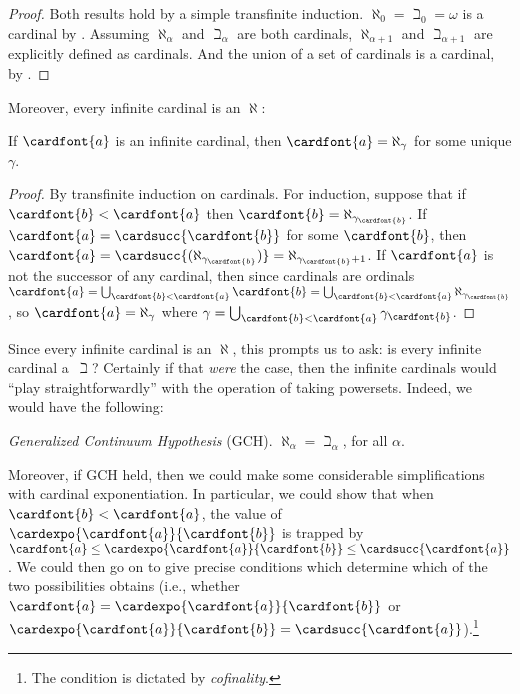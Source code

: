 \documentclass[../../../include/open-logic-section]{subfiles}
\begin{document}
\begin{proof}
Both results hold by a simple transfinite induction. $\aleph_0 =
\beth_0 = \omega$ is a cardinal by
. Assuming $\aleph_\alpha$ and
$\beth_\alpha$ are both cardinals, $\aleph_{\alpha+1}$ and
$\beth_{\alpha+1}$ are explicitly defined as cardinals. And the union
of a set of cardinals is a cardinal, by
.
\end{proof}
\noindent
Moreover, every infinite cardinal is an $\aleph$:

\begin{prop}
If $\cardfont{a}$ is an infinite cardinal, then $\cardfont{a} =
\aleph_\gamma$ for some unique $\gamma$.
\end{prop}

\begin{proof}
By transfinite induction on cardinals. For induction, suppose that if
$\cardfont{b} < \cardfont{a}$ then $\cardfont{b} =
\aleph_{\gamma_\cardfont{b}}$. If $\cardfont{a} =
\cardsucc{\cardfont{b}}$ for some $\cardfont{b}$, then $\cardfont{a} =
\cardsucc{(\aleph_{\gamma_\cardfont{b}})}=
\aleph_{\gamma_\cardfont{b}+1}$. If $\cardfont{a}$ is not the
successor of any cardinal, then since cardinals are ordinals
$\cardfont{a} = \bigcup_{\cardfont{b} < \cardfont{a}} \cardfont{b} =
\bigcup_{\cardfont{b} < \cardfont{a}}{\aleph_{\gamma_\cardfont{b}}}$,
so $\cardfont{a} = \aleph_\gamma$ where $\gamma =
\bigcup_{\cardfont{b} < \cardfont{a}}\gamma_\cardfont{b}$. 
\end{proof}

Since every infinite cardinal is an $\aleph$, this prompts us to ask:
is every infinite cardinal a~$\beth$? Certainly if that \emph{were}
the case, then the infinite cardinals would ``play straightforwardly''
with the operation of taking powersets. Indeed, we would have the
following:

\begin{defish}
\emph{Generalized Continuum Hypothesis} (GCH). $\aleph_\alpha  = \beth_\alpha$, for all $\alpha$. 
\end{defish}

Moreover, if GCH held, then we could make some considerable
simplifications with cardinal exponentiation. In particular, we could
show that when $\cardfont{b} < \cardfont{a}$, the value of
$\cardexpo{\cardfont{a}}{\cardfont{b}}$ is trapped by
$\cardfont{a}\leq \cardexpo{\cardfont{a}}{\cardfont{b}} \leq
\cardsucc{\cardfont{a}}$. We could then go on to give precise
conditions which determine which of the two possibilities obtains
(i.e., whether $\cardfont{a} = \cardexpo{\cardfont{a}}{\cardfont{b}}$
or $\cardexpo{\cardfont{a}}{\cardfont{b}} =
\cardsucc{\cardfont{a}}$).\footnote{The condition is dictated by
\emph{cofinality}.}
\end{document}
